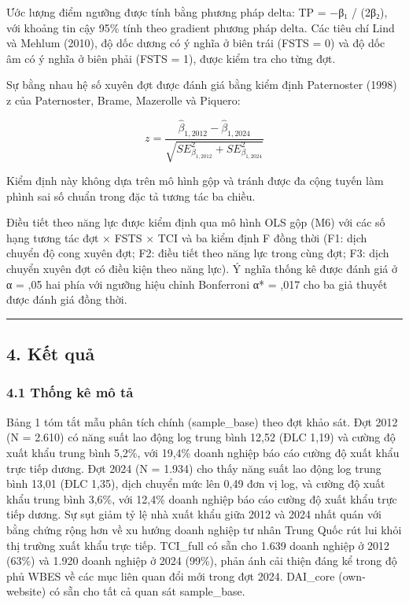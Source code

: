 \documentclass[12pt,a4paper]{article}
\begin{document}
Ước lượng điểm ngưỡng được tính bằng phương pháp delta: TP = −β₁ /
(2β₂), với khoảng tin cậy 95\% tính theo gradient phương pháp delta. Các
tiêu chí Lind và Mehlum (2010), độ dốc dương có ý nghĩa ở biên trái
(FSTS = 0) và độ dốc âm có ý nghĩa ở biên phải (FSTS = 1), được kiểm tra
cho từng đợt.

Sự bằng nhau hệ số xuyên đợt được đánh giá bằng kiểm định Paternoster
(1998) z của Paternoster, Brame, Mazerolle và Piquero:

\[z = \frac{\hat{\beta}_{1,2012} - \hat{\beta}_{1,2024}}{\sqrt{SE^2_{\beta_{1,2012}} + SE^2_{\beta_{1,2024}}}}\]

Kiểm định này không dựa trên mô hình gộp và tránh được đa cộng tuyến làm
phình sai số chuẩn trong đặc tả tương tác ba chiều.

Điều tiết theo năng lực được kiểm định qua mô hình OLS gộp (M6) với các
số hạng tương tác đợt × FSTS × TCI và ba kiểm định F đồng thời (F1: dịch
chuyển độ cong xuyên đợt; F2: điều tiết theo năng lực trong cùng đợt;
F3: dịch chuyển xuyên đợt có điều kiện theo năng lực). Ý nghĩa thống kê
được đánh giá ở α = ,05 hai phía với ngưỡng hiệu chỉnh Bonferroni α* =
,017 cho ba giả thuyết được đánh giá đồng thời.

\begin{center}\rule{0.5\linewidth}{0.5pt}\end{center}

\hypertarget{4-kux1ebft-quux1ea3}{%
\subsection{4. Kết quả}\label{4-kux1ebft-quux1ea3}}

\hypertarget{41-thux1ed1ng-kuxea-muxf4-tux1ea3}{%
\subsubsection{4.1 Thống kê mô
tả}\label{41-thux1ed1ng-kuxea-muxf4-tux1ea3}}

Bảng 1 tóm tắt mẫu phân tích chính (sample\_base) theo đợt khảo sát. Đợt
2012 (N = 2.610) có năng suất lao động log trung bình 12,52 (ĐLC 1,19)
và cường độ xuất khẩu trung bình 5,2\%, với 19,4\% doanh nghiệp báo cáo
cường độ xuất khẩu trực tiếp dương. Đợt 2024 (N = 1.934) cho thấy năng
suất lao động log trung bình 13,01 (ĐLC 1,35), dịch chuyển mức lên 0,49
đơn vị log, và cường độ xuất khẩu trung bình 3,6\%, với 12,4\% doanh
nghiệp báo cáo cường độ xuất khẩu trực tiếp dương. Sự sụt giảm tỷ lệ nhà
xuất khẩu giữa 2012 và 2024 nhất quán với bằng chứng rộng hơn về xu
hướng doanh nghiệp tư nhân Trung Quốc rút lui khỏi thị trường xuất khẩu
trực tiếp. TCI\_full có sẵn cho 1.639 doanh nghiệp ở 2012 (63\%) và
1.920 doanh nghiệp ở 2024 (99\%), phản ánh cải thiện đáng kể trong độ
phủ WBES về các mục liên quan đổi mới trong đợt 2024. DAI\_core
(own-website) có sẵn cho tất cả quan sát sample\_base.
\end{document}
